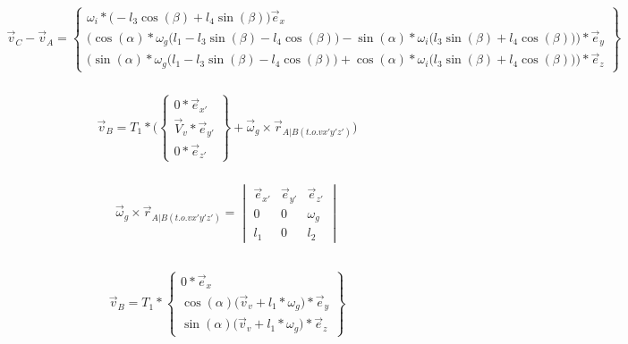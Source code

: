 \documentclass[a4paper,10pt]{article}
\begin{document}
\begin{equation}
	\begin{aligned}
		\vec{v}_C -\vec{v}_A = \begin{Bmatrix}
			{\omega_i*\Big( - l_3 \cos(\beta) + l_4 \sin(\beta)\Big)\vec{e}_{x}}\\
			\Big(\cos(\alpha)*\omega_g \Big(l_1 - l_3 \sin(\beta) - l_4 \cos(\beta)\Big) -\sin(\alpha)*	\omega_i \Big(l_3 \sin(\beta) + l_4 \cos(\beta)\Big)\Big)*\vec{e}_{y}\\
			\Big(\sin(\alpha)*\omega_g \Big(l_1 - l_3 \sin(\beta) - l_4 \cos(\beta)\Big) +\cos(\alpha)*	\omega_i \Big(l_3 \sin(\beta) + l_4 \cos(\beta)\Big)\Big)*\vec{e}_{z}
		\end{Bmatrix} 
	\end{aligned}
\end{equation}\\
\begin{equation}
	\begin{aligned}
		\vec{v}_B = {T}_{1}* \Big(\begin{Bmatrix}
			{0*\vec{e}_{x'}}\\
			\vec{V}_v*\vec{e}_{y'}\\
			0*\vec{e}_{z'} 
		\end{Bmatrix} + \vec{\omega}_g \times \vec{r}_{A|B(t.o.v x'y'z')}\Big)
	\end{aligned}
\end{equation}\\
\begin{equation}
	\begin{aligned}
		\vec{\omega}_g \times \vec{r}_{A|B(t.o.v x'y'z')} =  \begin{vmatrix}
			\vec{e}_{x'}& \vec{e}_{y'} & \vec{e}_{z'}\\
			0 & 0 &  \omega_g \\		
			l_1 & 0 & l_2
		\end{vmatrix}\\
	\end{aligned}
\end{equation}\\
\begin{equation}
	\begin{aligned}
		\vec{v}_B = {T}_{1}* \begin{Bmatrix}
			{0*\vec{e}_{x}}\\
			\cos(\alpha)\Big(\vec{v}_v + l_1*\omega_g \Big)*\vec{e}_{y}\\
			\sin(\alpha)\Big(\vec{v}_v + l_1*\omega_g\Big)*\vec{e}_{z} 
		\end{Bmatrix}
	\end{aligned}
\end{equation}\\
\end{document}
